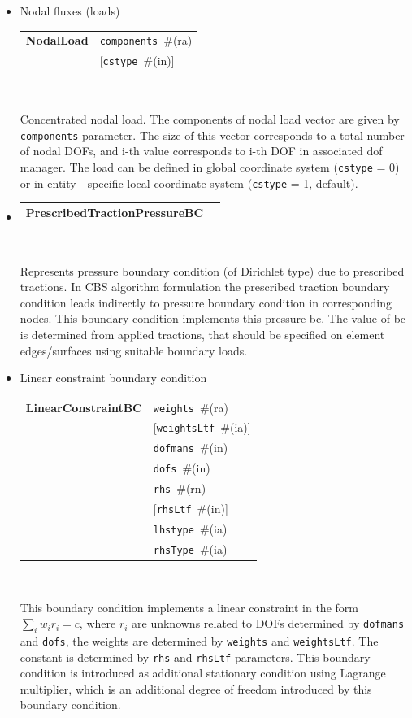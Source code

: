\documentclass[a4paper]{article}
\makeatletter
\newcommand{\param}[1]{\texttt{#1}} %
\newcommand{\optional}[1]{[#1]} %
\newcommand{\field}[2]{\param{#1}~\#{\tiny(#2)}} %
\newcommand{\optField}[2]{\optional{\field{#1}{#2}}}
\newcommand{\entKeywordInst}[1]{\textbf{#1}} %
\newenvironment{record}[1][]{\begin{tabular}{|ll}}{\end{tabular}\\}
\newcommand{\recentry}[2]{{#1}&{#2}\\}
\newcounter{rcc}
\newenvironment{record}[1][\textwidth]{\setcounter{rcc}{0}\begin{tabular*}{#1}{|ll@{\extracolsep{\fill}}r}}{\end{tabular*}\\}
\newcommand{\recentry}[2]{\ifthenelse{\value{rcc}>0}{&$\backslash$ \\}{\setcounter{rcc}{1}}{#1}&{#2}}
\makeatother
\begin{document}
\begin{itemize}
\item Nodal fluxes (loads)

\noindent
\begin{record}[0.9\textwidth]
  \recentry{\entKeywordInst{NodalLoad}}{\field{components}{ra}} \recentry{}{\optField{cstype}{in}}
\end{record}

Concentrated nodal load. The components of nodal load vector
are given by \param{components} parameter. The size of this vector
corresponds to a total number of nodal DOFs, and i-th value
corresponds to i-th DOF in associated dof manager. The load can be defined in global coordinate system (\param{cstype} =
0) or in entity - specific local coordinate system
(\param{cstype} = 1, default).
\item \mbox{}

\noindent
\begin{record}[0.9\textwidth]
  \recentry{\entKeywordInst{PrescribedTractionPressureBC}}{}
\end{record}

Represents pressure boundary condition (of Dirichlet type) due to
prescribed tractions.
In CBS algorithm formulation the prescribed traction
boundary condition leads indirectly to pressure boundary condition in
corresponding nodes. This boundary condition implements this pressure
bc. The value of bc is determined from applied tractions, that  should be specified on element edges/surfaces using
suitable boundary loads.

\item Linear constraint boundary condition

\noindent
\begin{record}[0.9\textwidth]
  \recentry{\entKeywordInst{LinearConstraintBC}}{\field{weights}{ra}} 
  \recentry{}{\optField{weightsLtf}{ia}}
  \recentry{}{\field{dofmans}{in}} \recentry{}{\field{dofs}{in}} 
  \recentry{}{\field{rhs}{rn}} \recentry{}{\optField{rhsLtf}{in}}
  \recentry{}{\field{lhstype}{ia}} \recentry{}{\field{rhsType}{ia}}
\end{record}

This boundary condition implements a linear constraint in the form $\sum_i w_ir_i = c$,
where $r_i$ are unknowns related to DOFs determined by \param{dofmans} and \param{dofs}, the weights are determined by \param{weights} and \param{weightsLtf}. The constant is determined by \param{rhs} and \param{rhsLtf} parameters. This boundary condition is introduced as additional stationary condition using Lagrange multiplier, which is an additional degree of freedom introduced by this boundary condition.


\end{itemize}
\end{document}
